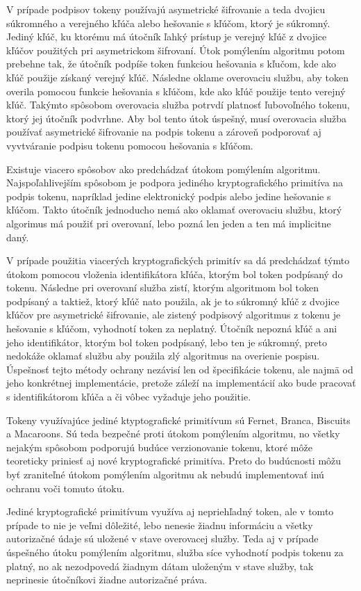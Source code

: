 V prípade podpisov tokeny používajú asymetrické šifrovanie a teda dvojicu súkromného a verejného kľúča alebo hešovanie s kľúčom, ktorý je súkromný. Jediný kľúč, ku ktorému má útočník ľahký prístup je verejný kľúč z dvojice kľúčov použitých pri asymetrickom šifrovaní. Útok pomýlením algoritmu potom prebehne tak, že útočník podpíše token funkciou hešovania s kľučom, kde ako kľúč použije získaný verejný kľúč. Následne oklame overovaciu službu, aby token overila pomocou funkcie hešovania s kľúčom, kde ako kľúč použije tento verejný kľúč. Takýmto spôsobom overovacia služba potrvdí platnosť ľubovoľného tokenu, ktorý jej útočník podvrhne. Aby bol tento útok úspešný, musí overovacia služba používať asymetrické šifrovanie na podpis tokenu a zároveň podporovať aj vyvtváranie podpisu tokenu pomocou hešovania s kľúčom.

Existuje viacero spôsobov ako predchádzať útokom pomýlením algoritmu. Najspoľahlivejším spôsobom je podpora jediného kryptografického primitíva na podpis tokenu, napríklad jedine elektronický podpis alebo jedine hešovanie s kľúčom. Takto útočník jednoducho nemá ako oklamať overovaciu službu, ktorý algorimus má použiť pri overovaní, lebo pozná len jeden a ten má implicitne daný. 

V prípade použitia viacerých kryptografických primitív sa dá predchádzať týmto útokom pomocou vloženia identifikátora kľúča, ktorým bol token podpísaný do tokenu. Následne pri overovaní služba zistí, ktorým algoritmom bol token podpísaný a taktiež, ktorý kľúč nato použila, ak je to súkromný kľúč z dvojice kľúčov pre asymetrické šifrovanie, ale zistený podpisový algoritmus z tokenu je hešovanie s kľúčom, vyhodnotí token za neplatný. Útočník nepozná kľúč a ani jeho identifikátor, ktorým bol token podpísaný, lebo ten je súkromný, preto nedokáže oklamať službu aby použila zlý algoritmus na overienie pospisu. Úspešnosť tejto métody ochrany nezávisí len od špecifikácie tokenu, ale najmä od jeho konkrétnej implementácie, pretože záleží na implementácií ako bude pracovať s identifikátorom kľúča a či vôbec vyžaduje jeho použitie.

Tokeny využívajúce jediné ktyptografické primitívum sú Fernet, Branca, Biscuits a Macaroons. Sú teda bezpečné proti útokom pomýlením algoritmu, no všetky nejakým spôsobom podporujú budúce verzionovanie tokenu, ktoré môže teoreticky priniesť aj nové kryptografické primitíva. Preto do budúcnosti môžu byť zraniteľné útokom pomýlením algoritmu ak nebudú implementovať inú ochranu voči tomuto útoku.

Jediné kryptografické primitívum využíva aj nepriehľadný token, ale v tomto prípade to nie je veľmi dôležité, lebo nenesie žiadnu informáciu a všetky autorizačné údaje sú uložené v stave overovacej služby. Teda aj v prípade úspešného útoku pomýlením algoritmu, služba síce vyhodnotí podpis tokenu za platný, no ak nezodpovedá žiadnym dátam uloženým v stave služby, tak neprinesie útočníkovi žiadne autorizačné práva.

